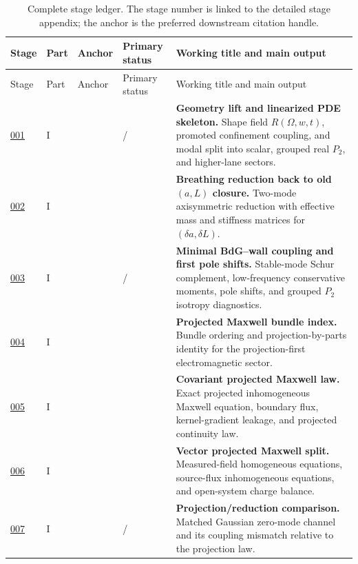 \scriptsize
{\setlength{\tabcolsep}{3pt}
\begin{longtable}{@{}L{0.055\textwidth}L{0.075\textwidth}L{0.145\textwidth}L{0.235\textwidth}L{0.43\textwidth}@{}}
\caption{Complete stage ledger.  The stage number is linked to the detailed stage appendix; the anchor is the preferred downstream citation handle.}\label{tab:complete-stage-ledger}\\
\toprule
Stage & Part & Anchor & Primary status & Working title and main output \\
\midrule
\endfirsthead
\toprule
Stage & Part & Anchor & Primary status & Working title and main output \\
\midrule
\endhead
\hyperref[stage:001]{001} & I &  & \StatusEffective{} / \StatusExactClosure{} & \textbf{Geometry lift and linearized PDE skeleton.} Shape field \(R(\Omega,w,t)\), promoted confinement coupling, and modal split into scalar, grouped real \(P_2\), and higher-lane sectors. \\
\addlinespace
\hyperref[stage:002]{002} & I &  & \StatusExactClosure{} & \textbf{Breathing reduction back to old \((a,L)\) closure.} Two-mode axisymmetric reduction with effective mass and stiffness matrices for \((\delta a,\delta L)\). \\
\addlinespace
\hyperref[stage:003]{003} & I &  & \StatusReduced{} / \StatusExactClosure{} & \textbf{Minimal BdG--wall coupling and first pole shifts.} Stable-mode Schur complement, low-frequency conservative moments, pole shifts, and grouped \(P_2\) isotropy diagnostics. \\
\addlinespace
\hyperref[stage:004]{004} & I &  & \StatusExact{} & \textbf{Projected Maxwell bundle index.} Bundle ordering and projection-by-parts identity for the projection-first electromagnetic sector. \\
\addlinespace
\hyperref[stage:005]{005} & I &  & \StatusExact{} & \textbf{Covariant projected Maxwell law.} Exact projected inhomogeneous Maxwell equation, boundary flux, kernel-gradient leakage, and projected continuity law. \\
\addlinespace
\hyperref[stage:006]{006} & I &  & \StatusExact{} & \textbf{Vector projected Maxwell split.} Measured-field homogeneous equations, source-flux inhomogeneous equations, and open-system charge balance. \\
\addlinespace
\hyperref[stage:007]{007} & I &  & \StatusExact{} / \StatusReduced{} & \textbf{Projection/reduction comparison.} Matched Gaussian zero-mode channel and its coupling mismatch relative to the projection law. \\

\end{longtable}}
